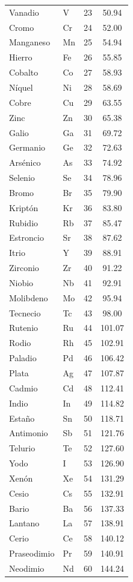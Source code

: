 \documentclass[12pt]{article}
\begin{document}
\begin{longtable}{llcc}
Vanadio & V & 23 & 50.94 \\
Cromo & Cr & 24 & 52.00 \\
Manganeso & Mn & 25 & 54.94 \\
Hierro & Fe & 26 & 55.85 \\
Cobalto & Co & 27 & 58.93 \\
Níquel & Ni & 28 & 58.69 \\
Cobre & Cu & 29 & 63.55 \\
Zinc & Zn & 30 & 65.38 \\
Galio & Ga & 31 & 69.72 \\
Germanio & Ge & 32 & 72.63 \\
Arsénico & As & 33 & 74.92 \\
Selenio & Se & 34 & 78.96 \\
Bromo & Br & 35 & 79.90 \\
Kriptón & Kr & 36 & 83.80 \\
Rubidio & Rb & 37 & 85.47 \\
Estroncio & Sr & 38 & 87.62 \\
Itrio & Y & 39 & 88.91 \\
Zirconio & Zr & 40 & 91.22 \\
Niobio & Nb & 41 & 92.91 \\
Molibdeno & Mo & 42 & 95.94 \\
Tecnecio & Tc & 43 & 98.00 \\
Rutenio & Ru & 44 & 101.07 \\
Rodio & Rh & 45 & 102.91 \\
Paladio & Pd & 46 & 106.42 \\
Plata & Ag & 47 & 107.87 \\
Cadmio & Cd & 48 & 112.41 \\
Indio & In & 49 & 114.82 \\
Estaño & Sn & 50 & 118.71 \\
Antimonio & Sb & 51 & 121.76 \\
Telurio & Te & 52 & 127.60 \\
Yodo & I & 53 & 126.90 \\
Xenón & Xe & 54 & 131.29 \\
Cesio & Cs & 55 & 132.91 \\
Bario & Ba & 56 & 137.33 \\
Lantano & La & 57 & 138.91 \\
Cerio & Ce & 58 & 140.12 \\
Praseodimio & Pr & 59 & 140.91 \\
Neodimio & Nd & 60 & 144.24 \\

\end{longtable}
\end{document}
